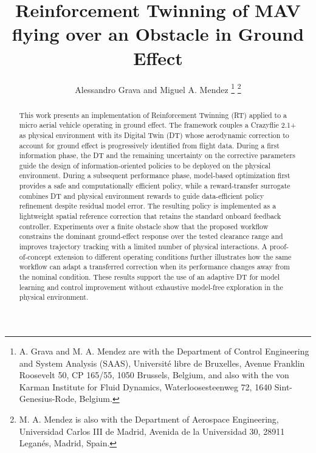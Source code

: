 \documentclass[journal]{IEEEtran}
\begin{document}
\title{Reinforcement Twinning of MAV flying over an Obstacle in Ground Effect}

\author{Alessandro Grava and Miguel A. Mendez%
\thanks{A. Grava and M. A. Mendez are with the Department of Control Engineering and System Analysis (SAAS), Universit\'e libre de Bruxelles, Avenue Franklin Roosevelt 50, CP 165/55, 1050 Brussels, Belgium, and also with the von Karman Institute for Fluid Dynamics, Waterloosesteenweg 72, 1640 Sint-Genesius-Rode, Belgium.}%
\thanks{M. A. Mendez is also with the Department of Aerospace Engineering, Universidad Carlos III de Madrid, Avenida de la Universidad 30, 28911 Legan\'es, Madrid, Spain.}}

\markboth{}{}
\maketitle

\begin{abstract}This work presents an implementation of Reinforcement Twinning (RT) applied to a micro aerial vehicle operating in ground effect. The framework couples a Crazyflie 2.1+ as physical environment with its Digital Twin (DT) whose aerodynamic correction to account for ground effect is progressively identified from flight data. During a first information phase, the DT and the remaining uncertainty on the corrective parameters guide the design of information-oriented policies to be deployed on the physical environment. During a subsequent performance phase, model-based optimization first provides a safe and computationally efficient policy, while a reward-transfer surrogate combines DT and physical environment rewards to guide data-efficient policy refinement despite residual model error. The resulting policy is implemented as a lightweight spatial reference correction that retains the standard onboard feedback controller. Experiments over a finite obstacle show that the proposed workflow constrains the dominant ground-effect response over the tested clearance range and improves trajectory tracking with a limited number of physical interactions. A proof-of-concept extension to different operating conditions further illustrates how the same workflow can adapt a transferred correction when its performance changes away from the nominal condition. These results support the use of an adaptive DT for model learning and control improvement without exhaustive model-free exploration in the physical environment.\end{abstract}
\end{document}
